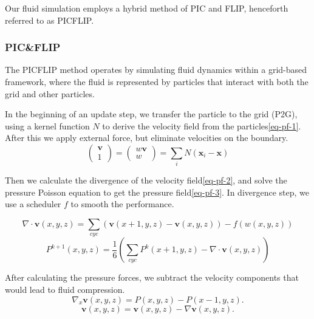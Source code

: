 Our fluid simulation employs a hybrid method of PIC\cite{harlow1964particle} and FLIP, henceforth referred to as PICFLIP. 

\subsubsection{PIC\&FLIP}

The PICFLIP method operates by simulating fluid dynamics within a grid-based framework, where the fluid is represented by particles that interact with both the grid and other particles. 

In the beginning of an update step, we transfer the particle to the grid (P2G), using a kernel function $N$ to derive the velocity field from the particles\eqref{eq-pf-1}. After this we apply external force, but eliminate velocities on the boundary.
\begin{equation}
  \label{eq-pf-1}
  \begin{pmatrix}\mathbf{v}\\1\end{pmatrix}=\begin{pmatrix}w\mathbf{v}\\w\end{pmatrix}=\sum_{i}N(\mathbf{x}_i-\mathbf{x})
\end{equation}

Then we calculate the divergence of the velocity field\eqref{eq-pf-2}, and solve the pressure Poisson equation to get the pressure field\eqref{eq-pf-3}. In divergence step, we use a scheduler $f$ to smooth the performance. 

\begin{equation}
  \label{eq-pf-2}
  \nabla \cdot \mathbf{v}(x,y,z) = \sum_{cyc}(\mathbf{v}(x+1,y,z)-\mathbf{v}(x,y,z))-f(w(x,y,z))
\end{equation}
\begin{equation}
  \label{eq-pf-3}
  P^{k+1}(x,y,z)=\frac{1}{6}\left(\sum_{cyc}P^k(x+1,y,z)-\nabla \cdot \mathbf{v}(x,y,z)\right)
\end{equation}

After calculating the pressure forces, we subtract the velocity components that would lead to fluid compression.
\begin{equation}
  \label{eq-pf-4}
  \nabla_x\mathbf{v}(x,y,z)=P(x,y,z)-P(x-1,y,z).
\end{equation}
\begin{equation}
  \label{eq-pf-5}
  \mathbf{v}(x,y,z)=\mathbf{v}(x,y,z)-\nabla\mathbf{v}(x,y,z).
\end{equation}

